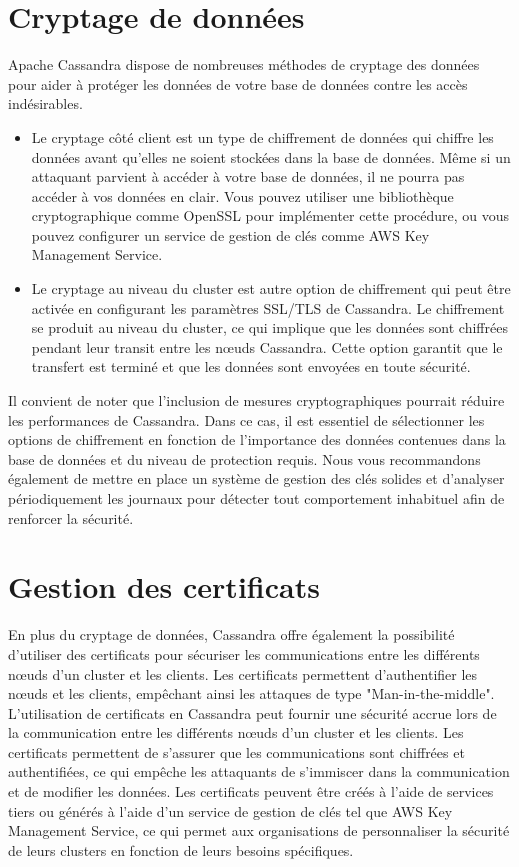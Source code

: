 \documentclass[12pt, letterpaper]{report}
\begin{document}
\section{Cryptage de données}
Apache Cassandra dispose de nombreuses méthodes de cryptage des données pour aider à protéger les données de votre base de données contre les accès indésirables.
\newline
\begin{itemize}
  \item Le cryptage côté client est un type de chiffrement de données qui chiffre les données avant qu'elles ne soient stockées dans la base de données. Même si un attaquant parvient à accéder à votre base de données, il ne pourra pas accéder à vos données en clair. Vous pouvez utiliser une bibliothèque cryptographique comme OpenSSL pour implémenter cette procédure, ou vous pouvez configurer un service de gestion de clés comme AWS Key Management Service.
  \item Le cryptage au niveau du cluster est autre option de chiffrement qui peut être activée en configurant les paramètres SSL/TLS de Cassandra. Le chiffrement se produit au niveau du cluster, ce qui implique que les données sont chiffrées pendant leur transit entre les nœuds Cassandra. Cette option garantit que le transfert est terminé et que les données sont envoyées en toute sécurité.
\end{itemize} 
Il convient de noter que l'inclusion de mesures cryptographiques pourrait réduire les performances de Cassandra. Dans ce cas, il est essentiel de sélectionner les options de chiffrement en fonction de l'importance des données contenues dans la base de données et du niveau de protection requis. Nous vous recommandons également de mettre en place un système de gestion des clés solides et d'analyser périodiquement les journaux pour détecter tout comportement inhabituel afin de renforcer la sécurité.

\section{Gestion des certificats}
En plus du cryptage de données, Cassandra offre également la possibilité d'utiliser des certificats pour sécuriser les communications entre les différents nœuds d'un cluster et les clients. Les certificats permettent d'authentifier les nœuds et les clients, empêchant ainsi les attaques de type "Man-in-the-middle". 
\newline
L'utilisation de certificats en Cassandra peut fournir une sécurité accrue lors de la communication entre les différents nœuds d'un cluster et les clients. Les certificats permettent de s'assurer que les communications sont chiffrées et authentifiées, ce qui empêche les attaquants de s'immiscer dans la communication et de modifier les données. Les certificats peuvent être créés à l'aide de services tiers ou générés à l'aide d'un service de gestion de clés tel que AWS Key Management Service, ce qui permet aux organisations de personnaliser la sécurité de leurs clusters en fonction de leurs besoins spécifiques.
\end{document}
